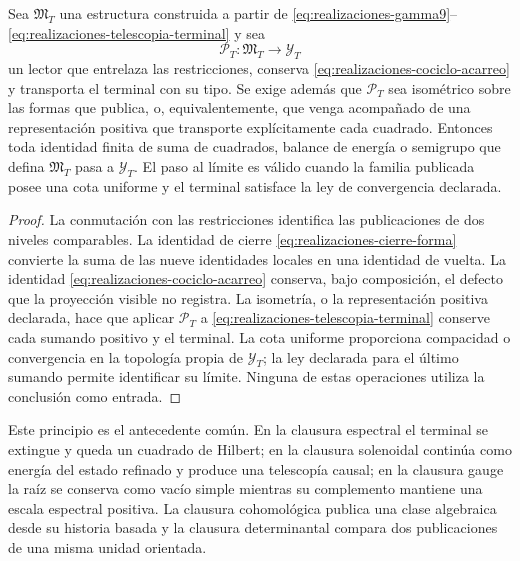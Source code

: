 \begin{proposition}
\label{prop:realizaciones-transporte-especializado}
Sea \(\mathfrak M_T\) una estructura construida a partir de
\eqref{eq:realizaciones-gamma9}--\eqref{eq:realizaciones-telescopia-terminal}
y sea
\[
 \mathcal P_T:\mathfrak M_T\longrightarrow\mathcal Y_T
\]
un lector que entrelaza las restricciones, conserva
\eqref{eq:realizaciones-cociclo-acarreo} y transporta el terminal con su tipo.
Se exige además que \(\mathcal P_T\) sea isométrico sobre las formas que
publica, o, equivalentemente, que venga acompañado de una representación
positiva que transporte explícitamente cada cuadrado. Entonces toda identidad
finita de suma de cuadrados, balance de energía o semigrupo que defina
\(\mathfrak M_T\) pasa a \(\mathcal Y_T\). El paso al
límite es válido cuando la familia publicada posee una cota uniforme y el
terminal satisface la ley de convergencia declarada.
\end{proposition}

\begin{proof}
La conmutación con las restricciones identifica las publicaciones de dos
niveles comparables. La identidad de cierre
\eqref{eq:realizaciones-cierre-forma} convierte la suma de las nueve
identidades locales en una identidad de vuelta. La identidad
\eqref{eq:realizaciones-cociclo-acarreo} conserva, bajo composición, el
defecto que la proyección visible no registra. La isometría, o la
representación positiva declarada, hace que aplicar \(\mathcal P_T\) a
\eqref{eq:realizaciones-telescopia-terminal} conserve cada sumando positivo
y el terminal. La cota uniforme proporciona compacidad o convergencia en la
topología propia de \(\mathcal Y_T\); la ley declarada para el último
sumando permite identificar su límite. Ninguna de estas operaciones utiliza
la conclusión como entrada.
\end{proof}

Este principio es el antecedente común. En la clausura espectral el terminal
se extingue y queda un cuadrado de Hilbert; en la clausura solenoidal continúa
como energía del estado refinado y produce una telescopía causal; en la
clausura gauge la raíz se conserva como vacío simple mientras su complemento
mantiene una escala espectral positiva. La clausura cohomológica publica una
clase algebraica desde su historia basada y la clausura determinantal compara
dos publicaciones de una misma unidad orientada.



